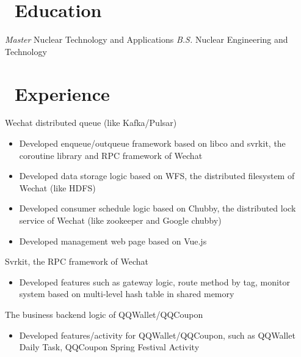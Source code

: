 \documentclass{resume}
\begin{document}



\section{\faGraduationCap\ Education}
\textit{Master} Nuclear Technology and Applications 
\textit{B.S.} Nuclear Engineering and Technology

\section{\faUsers\ Experience}
Wechat distributed queue (like Kafka/Pulsar)
\begin{itemize}
  \item Developed enqueue/outqueue framework based on libco and svrkit, the coroutine library and RPC framework of Wechat
  \item Developed data storage logic based on WFS, the distributed filesystem of Wechat (like HDFS)
  \item Developed consumer schedule logic based on Chubby, the distributed lock service of Wechat (like zookeeper and Google chubby)
  \item Developed management web page based on Vue.js
\end{itemize}

Svrkit, the RPC framework of Wechat
\begin{itemize}
  \item Developed features such as gateway logic, route method by tag, monitor system based on multi-level hash table in shared memory
\end{itemize}

The business backend logic of QQWallet/QQCoupon
\begin{itemize}
  \item Developed features/activity for QQWallet/QQCoupon, such as QQWallet Daily Task, QQCoupon Spring Festival Activity
\end{itemize}
\end{document}
